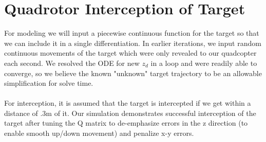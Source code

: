 \documentclass{article}
\begin{document}
\section*{Quadrotor Interception of Target}
For modeling we will input a piecewise continuous function for the target so that we can include it in a single differentiation.  In earlier iterations, we input random continuous movements of the target which were only revealed to our quadcopter each second.  We resolved the ODE for new $z_d$ in a loop and were readily able to converge, so we believe the known "unknown" target trajectory to be an allowable simplification for solve time.\\
\\
For interception, it is assumed that the target is intercepted if we get within a distance of .3m of it.   Our simulation demonstrates successful interception of the target after tuning the Q matrix to de-emphasize errors in the z direction (to enable smooth up/down movement) and penalize x-y errors.  
\end{document}
